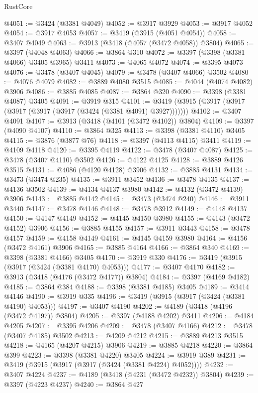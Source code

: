 \begin{lexlean}{RustCore}
\begin{coremodule}
@4051 := @3424 (@3381 @4049)
@4052 := @3917 @3929
@4053 := @3917 @4052
@4054 := @3917 @4053
@4057 := @3419 (@3915 (@4051 @4054))
@4058 := @3407 @4049
@4063 := @3913 (@3418 (@4057 (@3472 @4058)) @3804)
@4065 := @3397 (@4048 @4063)
@4066 := @3864 @310
@4072 := @3397 (@3398 (@3381 @4066) @3405 @3965) @3411
@4073 := @4065 @4072
@4074 := @3395 @4073
@4076 := @3478 (@3407 @4045)
@4079 := @3478 (@3407 @4066) @3502
@4080 := @4076 @4079
@4082 := @3889 @4080 @3515
@4085 := @4044 (@4074 @4082) @3906
@4086 := @3885 @4085
@4087 := @3864 @320
@4090 := @3398 (@3381 @4087) @3405
@4091 := @3919 @315
@4101 := @3419 (@3915 (@3917 (@3917 (@3917 (@3917 (@3917 (@3424 (@3381 @4091) @3927)))))))
@4102 := @3407 @4091
@4107 := @3913 (@3418 (@4101 (@3472 @4102)) @3804)
@4109 := @3397 (@4090 @4107)
@4110 := @3864 @325
@4113 := @3398 (@3381 @4110) @3405
@4115 := @3876 (@3877 @76)
@4118 := @3397 (@4113 @4115) @3411
@4119 := @4109 @4118
@4120 := @3395 @4119
@4122 := @3478 (@3407 @4087)
@4125 := @3478 (@3407 @4110) @3502
@4126 := @4122 @4125
@4128 := @3889 @4126 @3515
@4131 := @4086 (@4120 @4128) @3906
@4132 := @3885 @4131
@4134 := @3473 (@3474 @235)
@4135 := @3911 @3452
@4136 := @3478 @4135
@4137 := @4136 @3502
@4139 := @4134 @4137 @3980
@4142 := @4132 (@3472 @4139) @3906
@4143 := @3885 @4142
@4145 := @3473 (@3474 @240)
@4146 := @3911 @3440
@4147 := @3478 @4146
@4148 := @3478 @3912
@4149 := @4148 @4137
@4150 := @4147 @4149
@4152 := @4145 @4150 @3980
@4155 := @4143 (@3472 @4152) @3906
@4156 := @3885 @4155
@4157 := @3911 @3443
@4158 := @3478 @4157
@4159 := @4158 @4149
@4161 := @4145 @4159 @3980
@4164 := @4156 (@3472 @4161) @3906
@4165 := @3885 @4164
@4166 := @3864 @340
@4169 := @3398 (@3381 @4166) @3405
@4170 := @3919 @330
@4176 := @3419 (@3915 (@3917 (@3424 (@3381 @4170) @4053)))
@4177 := @3407 @4170
@4182 := @3913 (@3418 (@4176 (@3472 @4177)) @3804)
@4184 := @3397 (@4169 @4182)
@4185 := @3864 @384
@4188 := @3398 (@3381 @4185) @3405
@4189 := @3414 @4146
@4190 := @3919 @335
@4196 := @3419 (@3915 (@3917 (@3424 (@3381 @4190) @4053)))
@4197 := @3407 @4190
@4202 := @4189 (@3418 (@4196 (@3472 @4197)) @3804)
@4205 := @3397 (@4188 @4202) @3411
@4206 := @4184 @4205
@4207 := @3395 @4206
@4209 := @3478 (@3407 @4166)
@4212 := @3478 (@3407 @4185) @3502
@4213 := @4209 @4212
@4215 := @3889 @4213 @3515
@4218 := @4165 (@4207 @4215) @3906
@4219 := @3885 @4218
@4220 := @3864 @399
@4223 := @3398 (@3381 @4220) @3405
@4224 := @3919 @389
@4231 := @3419 (@3915 (@3917 (@3917 (@3424 (@3381 @4224) @4052))))
@4232 := @3407 @4224
@4237 := @4189 (@3418 (@4231 (@3472 @4232)) @3804)
@4239 := @3397 (@4223 @4237)
@4240 := @3864 @427

\end{coremodule}
\end{lexlean}
